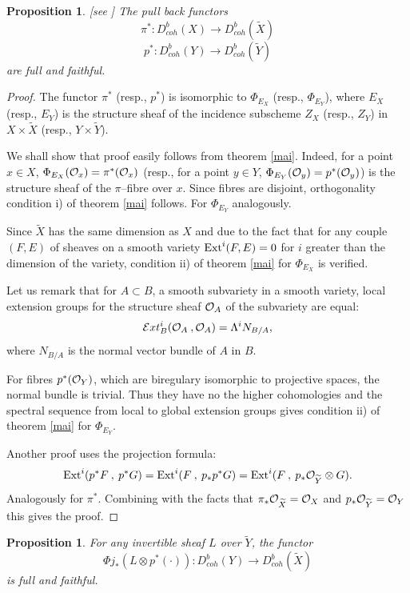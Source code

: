 \documentclass[12pt]{article}
\newtheorem{proposition}[theorem]{Proposition}
\def\db#1{ D^b_{coh}({#1})}
\def\lto{\longrightarrow}
\def\o#1{{\cal O}_{#1}}
\begin{document}
\begin{proposition}\label{blow} [see \cite{or}]
The pull back functors
$$
\pi^*: \db {X}\lto \db {\widetilde X}
$$
$$
p^*: \db {Y}\lto \db {\widetilde Y}
$$
are full and faithful.
\end{proposition}
\begin{proof}
The functor $\pi^*$ (resp., $p^*$) is isomorphic to $\Phi_{E_X}$ (resp., $\Phi_{E_Y}$), where $E_X$ (resp., $E_Y$) is the structure sheaf of the incidence subscheme $Z_X$ (resp., $Z_Y$) in $X\times {\widetilde X}$ (resp., $Y\times {\widetilde Y}$). 

We shall show that proof easily follows from theorem \ref{mai}. Indeed, for a point $x\in X$, $\Phi_{E_X}({\o x})=\pi^*({\o x})$ (resp., for a point $y\in Y$, $\Phi_{E_Y}({\o y})=p^*({\o y})$) is the structure sheaf of the $\pi$--fibre over $x$. Since fibres are disjoint,  orthogonality condition i) of theorem \ref{mai} follows. For $\Phi_{E_Y}$ analogously.

Since $\widetilde X$ has the same dimension as $X$ and due to the fact that for any couple $(F, E)$ of sheaves on a smooth variety ${\rm Ext}^i(F, E)=0$ for $i$ greater than the dimension of the variety, condition ii) of theorem \ref{mai} for $\Phi_{E_X}$ is verified.

Let us remark that for $A\subset B$, a smooth subvariety in a smooth variety, local extension groups for the structure sheaf ${\o A}$ of the subvariety are equal:
\begin{equation}\label{ext}
{\cal E}xt^i_B({\o A}\:, {\o A})=\Lambda^i N_{B/A},
\end{equation}
where $N_{B/A}$ is the normal vector bundle of $A$ in $B$.

For fibres $p^*({\o Y})$, which are biregulary isomorphic to projective spaces, the normal bundle is trivial. Thus they have no the higher cohomologies and the spectral sequence from local to global extension groups gives condition ii) of theorem \ref{mai} for $\Phi_{E_Y}$.

Another proof uses the projection formula:
$$
{\rm Ext}^i(p^*F\:,\:p^*G)={\rm Ext}^i(F\:,\:p_*p^*G)={\rm Ext}^i(F\:,\:p_*{\o {\widetilde Y}}\otimes G).
$$
Analogously for $\pi^*$.
Combining with the facts that $\pi_*{\o{\widetilde X}}={\o X}$ and $p_*{\o{\widetilde Y}}={\o Y}$ this gives the proof.
\end{proof}
\begin{proposition}\label{emb}
For any invertible sheaf $L$ over $\widetilde Y$, the functor
$$
\Phi j_*(L\otimes p^*(\cdot)): \db {Y}\lto \db {\widetilde X}
$$
is full and faithful. 
\end{proposition}
\end{document}
